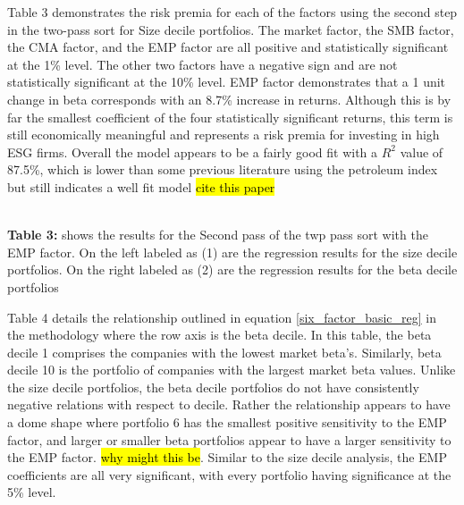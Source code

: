 Table 3 demonstrates the risk premia for each of the factors using the second step in the two-pass sort for Size decile portfolios. The market factor, the SMB factor, the CMA factor, and the EMP factor are all positive and statistically significant at the 1\% level. The other two factors have a negative sign and are not statistically significant at the 10\% level.  EMP factor demonstrates that a 1 unit change in beta corresponds with an 8.7\% increase in returns. Although this is by far the smallest coefficient of the four statistically significant returns, this term is still economically meaningful and represents a risk premia for investing in high ESG firms. Overall the model appears to be a fairly good fit with a $R^2$ value of 87.5\%, which is lower than some previous literature using the petroleum index but still indicates a well fit model \hl{cite this paper} 


\begin{center}
    \paperspacingnarrow
    \\
    \textbf{Table 3:} shows the results for the Second pass of the twp pass sort with the EMP factor. On the left labeled as (1) are the regression results for the size decile portfolios. On the right labeled as (2) are the regression results for the beta decile portfolios\\
    \paperspacingwide
\end{center}

Table 4 details the relationship outlined in equation \eqref{six_factor_basic_reg} in the methodology where the row axis is the beta decile. In this table,  the beta decile 1 comprises the companies with the lowest market beta's. Similarly, beta decile 10 is the portfolio of companies with the largest market beta values.  Unlike the size decile portfolios, the beta decile portfolios do not have consistently negative relations with respect to decile. Rather the relationship appears to have a dome shape where portfolio 6 has the smallest positive sensitivity to the EMP factor, and larger or smaller beta portfolios appear to have a larger sensitivity to the  EMP factor. \hl{why might this be}. Similar to the size decile analysis, the EMP coefficients are all very significant, with every portfolio having significance at the 5\% level. 

